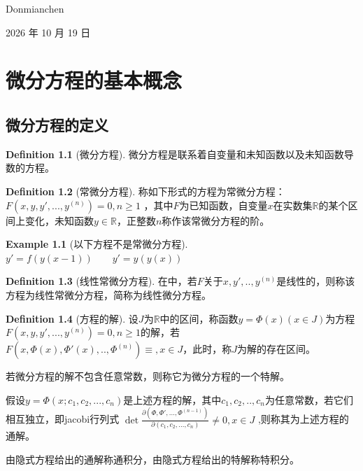 \documentclass[oneside]{book}
\theoremstyle{definition}
\theoremstyle{definition}
\theoremstyle{cth}
\newtheorem{definition}{Definition}[section]
\theoremstyle{cnthm}
\newtheorem{example}{Example}[section]
\begin{document}
	\hfill Donmianchen
	
	\hfill 2026 年 10 月 19 日
	


	
	
	\tableofcontents
	
	
	
	
	
	
	\chapter{微分方程的基本概念}
	\section{微分方程的定义}
		
		\begin{definition}[微分方程]
		
			微分方程是联系着自变量和未知函数以及未知函数导数的方程。
		
		\end{definition}
		
		\begin{definition}[常微分方程]
			
			称如下形式的方程为常微分方程：$\displaystyle F(x,y,y',...,y^{(n)})=0,n\geq 1$
			，其中$F$为已知函数，自变量$x$在实数集$\mathbb{R}$的某个区间上变化，未知函数$y\in \mathbb{R}$，正整数$n$称作该常微分方程的阶。
			
		\end{definition}
		
		\begin{example}[以下方程不是常微分方程]
			
			$y'=f(y(x-1))\qquad y'=y(y(x))$
			
		\end{example}
		
		\begin{definition}[线性常微分方程]
			
			在中，若$F$关于$x,y',..,y^{(n)}$是线性的，则称该方程为线性常微分方程，简称为线性微分方程。
			
		\end{definition}
		
		\begin{definition}[方程的解]
			
			设$J$为$\mathbb{R}$中的区间，称函数$y=\Phi (x)(x\in J)$为方程$\displaystyle F(x,y,y',...,y^{(n)})=0,n\geq 1$的解，若
			$F(x,\Phi (x),\Phi '(x),..,\Phi ^{(n)})\equiv ,x\in J$，此时，称$J$为解的存在区间。
			
			若微分方程的解不包含任意常数，则称它为微分方程的一个特解。
			
			假设$y=\Phi (x;c_1,c_2,...,c_n)$是上述方程的解，其中$c_1,c_2,..,c_n$为任意常数，若它们相互独立，即jacobi行列式
			$\displaystyle \det{\frac{\partial (\Phi,\Phi ',...,\Phi ^{(n-1)})}{\partial (c_1,c_2,...,c_n)}\neq 0,x\in J}$
			,则称其为上述方程的通解。
			
			由隐式方程给出的通解称通积分，由隐式方程给出的特解称特积分。
			
		\end{definition}
		
\end{document}
